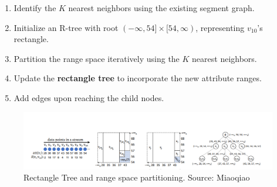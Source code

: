 \begin{enumerate}  
    \item Identify the $K$ nearest neighbors using the existing segment graph.  
    \item Initialize an R-tree with root $(-\infty, 54] \times [54, \infty)$, representing $v_{10}$'s rectangle.  
    \item Partition the range space iteratively using the $K$ nearest neighbors.  
    \item Update the \textbf{rectangle tree} to incorporate the new attribute ranges.  
    \item Add edges upon reaching the child nodes.  
\end{enumerate} 



\begin{figure}[h]
    \centering
\includegraphics[width=1.1\textwidth]{IMAGES/immagine_2025-03-01_191002770.png}
    \caption{Rectangle Tree and range space partitioning. Source: Miaoqiao\footnotemark[2]}
    \label{fig:Rectangle Tree}
\end{figure}
